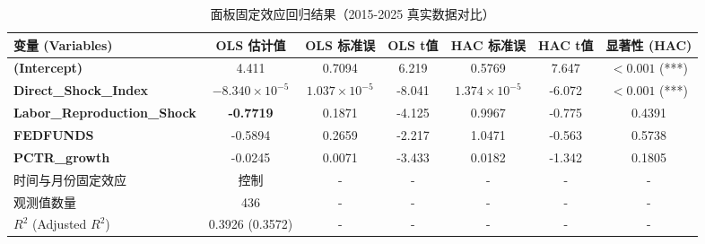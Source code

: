 \documentclass[UTF8,a4paper,11pt]{ctexart}
\begin{document}
\begin{table}[H]
\centering
\caption{面板固定效应回归结果（2015-2025 真实数据对比）}
\label{tab:regression}
\begin{tabular}{lcccccc}
\toprule
变量 (Variables) & OLS 估计值 & OLS 标准误 & OLS t值 & HAC 标准误 & HAC t值 & 显著性 (HAC) \\
\midrule
\textbf{(Intercept)} & 4.411 & 0.7094 & 6.219 & 0.5769 & 7.647 & $< 0.001$ (***) \\
\textbf{Direct\_Shock\_Index} & $-8.340\times 10^{-5}$ & $1.037\times 10^{-5}$ & -8.041 & $1.374\times 10^{-5}$ & -6.072 & $< 0.001$ (***) \\
\textbf{Labor\_Reproduction\_Shock} & \textbf{-0.7719} & 0.1871 & -4.125 & 0.9967 & -0.775 & 0.4391 \\
\textbf{FEDFUNDS} & -0.5894 & 0.2659 & -2.217 & 1.0471 & -0.563 & 0.5738 \\
\textbf{PCTR\_growth} & -0.0245 & 0.0071 & -3.433 & 0.0182 & -1.342 & 0.1805 \\
\midrule
时间与月份固定效应 & 控制 & - & - & - & - & - \\
观测值数量 & 436 & - & - & - & - & - \\
$R^2$ (Adjusted $R^2$) & 0.3926 (0.3572) & - & - & - & - & - \\
\bottomrule
\end{tabular}
\end{table}
\end{document}
